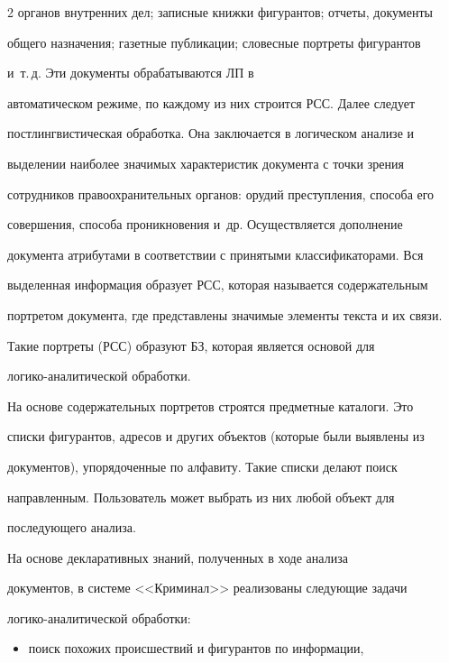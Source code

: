 \begin{multicols}{2}
органов внутренних дел; записные книжки фигурантов; отчеты, документы


общего назначения; газетные публикации; словесные портреты фигурантов


и~т.\,д. Эти документы обрабатываются ЛП в


автоматическом режиме, по каждому из них строится РСС. Далее следует


постлингвистическая обработка. Она заключается в логическом анализе и


выделении наиболее значимых характеристик документа с точки зрения


сотрудников правоохранительных органов: орудий преступления, способа его


совершения, способа проникновения и~др. Осуществляется дополнение


документа атрибутами в соответствии с принятыми классификаторами. Вся


выделенная информация образует РСС, которая называется содержательным


портретом документа, где представлены значимые элементы текста и их связи.


Такие портреты (РСС) образуют БЗ, которая является основой для


ло\-ги\-ко-ана\-ли\-ти\-че\-ской обработки.





 На основе содержательных портретов строятся предметные каталоги. Это


списки фигурантов, адресов и других объектов (которые были выявлены из


документов), упорядоченные по алфавиту. Такие списки делают поиск


направленным. Пользователь может выбрать из них любой объект для


последующего анализа.





 На основе декларативных знаний, полученных в ходе анализа


документов, в системе <<Криминал>> реализованы следующие задачи


ло\-ги\-ко-ана\-ли\-ти\-че\-ской обработки:


 \begin{itemize}


 \item поиск похожих происшествий и фигурантов по информации,



\end{itemize}
\end{multicols}

